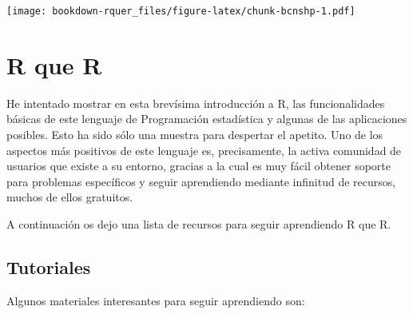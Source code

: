 \documentclass[]{book}
\theoremstyle{definition}
\theoremstyle{definition}
\theoremstyle{definition}
\theoremstyle{remark}
\begin{document}
\texttt{[image: bookdown-rquer\_files/figure-latex/chunk-bcnshp-1.pdf]}

\hypertarget{r-que-r}{%
\chapter{R que R}\label{r-que-r}}

He intentado mostrar en esta brevísima introducción a R, las
funcionalidades básicas de este lenguaje de Programación estadística y
algunas de las aplicaciones posibles. Esto ha sido sólo una muestra para
despertar el apetito. Uno de los aspectos más positivos de este lenguaje
es, precisamente, la activa comunidad de usuarios que existe a su
entorno, gracias a la cual es muy fácil obtener soporte para problemas
específicos y seguir aprendiendo mediante infinitud de recursos, muchos
de ellos gratuitos.

A continuación os dejo una lista de recursos para seguir aprendiendo R
que R.

\hypertarget{tutoriales}{%
\section{Tutoriales}\label{tutoriales}}

Algunos materiales interesantes para seguir aprendiendo son:
\end{document}
